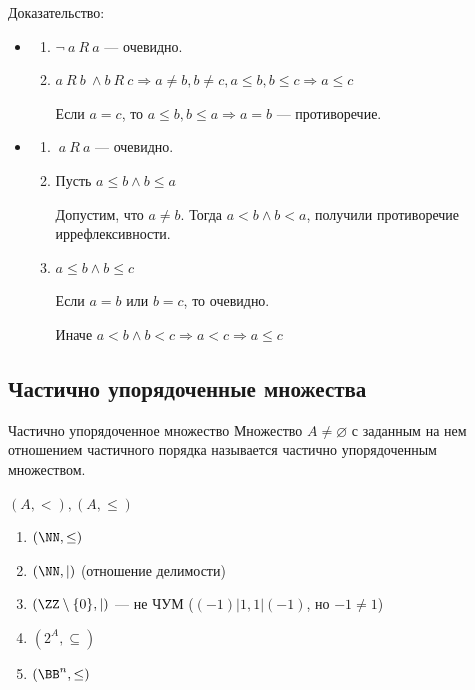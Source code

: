 Доказательство:
\begin{itemize}
    \item
        \begin{enumerate}
            \item
                \( \lnot \ a \ R \ a \) --- очевидно.
            \item
                \( a \ R \ b \ \land b \ R \ c \Rightarrow a \neq b, b \neq c, a \leq b, b \leq c \Rightarrow a \leq c\)

                Если \( a = c \), то \( a \leq b, b \leq a \Rightarrow a = b \) --- противоречие.
        \end{enumerate}
    \item
        \begin{enumerate}
            \item
                \( \ a \ R \ a \) --- очевидно.
            \item
                Пусть \( a \leq b \land b \leq a \)

                Допустим, что \( a \neq b \).
                Тогда \( a < b \land b < a \), получили противоречие иррефлексивности.
            \item
                \( a \leq b \land b \leq c \)

                Если \( a = b \) или \( b = c \), то очевидно.

                Иначе \( a < b \land b < c \Rightarrow a < c \Rightarrow a \leq c \)
        \end{enumerate}
\end{itemize}

\subsection{Частично упорядоченные множества}

\begin{defn}{Частично упорядоченное множество}{}
    Множество \( A \neq \varnothing \) с заданным на нем отношением
    частичного порядка называется частично упорядоченным множеством.

    \( (A, <), (A, \leq) \)
\end{defn}

\begin{example}{}{}
    \begin{enumerate}
        \item
            \( (\NN, \leq) \)
        \item
            \( (\NN, |) \) (отношение делимости)
        \item
            \( (\ZZ \setminus \{ 0 \}, |) \) --- не ЧУМ (\( (-1) | 1, 1 | (-1) \), но \( -1 \neq 1 \))
        \item
            \( (2^A, \subseteq) \)
        \item
            \( (\BB^n, \leq) \)
    \end{enumerate}
\end{example}

